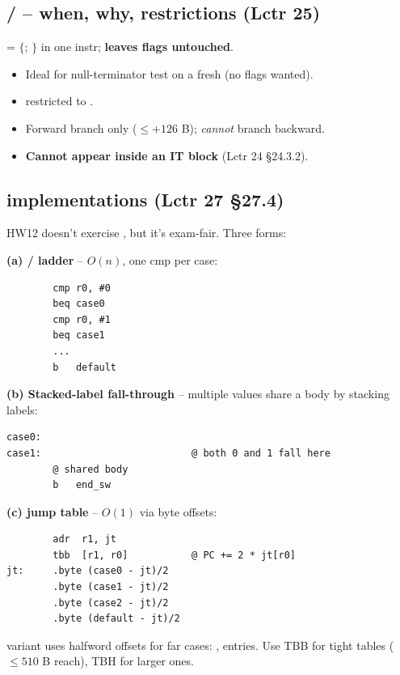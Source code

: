 \subsection{/ -- when, why, restrictions (Lctr 25)}
\textbf{} = $\{$; $\}$ in one instr; \textbf{leaves flags untouched}.
\begin{itemize}
\item Ideal for null-terminator test on a fresh  (no flags wanted).
\item {} restricted to .
\item Forward branch only ($\le {+}126$ B); \emph{cannot} branch backward.
\item \textbf{Cannot appear inside an IT block} (Lctr 24 \S24.3.2).
\end{itemize}

\subsection{ implementations (Lctr 27 \S27.4)}
HW12 doesn't exercise , but it's exam-fair. Three forms:

\textbf{(a) / ladder} -- $O(n)$, one cmp per case:
\begin{lstlisting}
        cmp r0, #0
        beq case0
        cmp r0, #1
        beq case1
        ...
        b   default
\end{lstlisting}

\textbf{(b) Stacked-label fall-through} -- multiple values share a body by stacking labels:
\begin{lstlisting}
case0:
case1:                          @ both 0 and 1 fall here
        @ shared body
        b   end_sw
\end{lstlisting}

\textbf{(c)  jump table} -- $O(1)$ via byte offsets:
\begin{lstlisting}
        adr  r1, jt
        tbb  [r1, r0]           @ PC += 2 * jt[r0]
jt:     .byte (case0 - jt)/2
        .byte (case1 - jt)/2
        .byte (case2 - jt)/2
        .byte (default - jt)/2
\end{lstlisting}
\textbf{} variant uses halfword offsets for far cases: ,  entries. Use TBB for tight tables ($\le 510$ B reach), TBH for larger ones.

